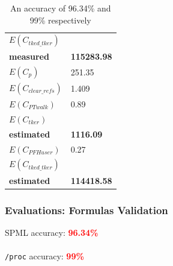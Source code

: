 \documentclass[xcolor=table,bigger,unknownkeysallowed]{beamer}
\newcommand{\myemph}[1]{\textcolor{red}{\bf #1}}
\begin{document}
\begin{frame}
\begin{table}[h]
\begin{subtable}[b]{.45\textwidth}
\begin{tabular}{l l}
				\textcolor{airforceblue}{\textbf{$E(C_{tked\_tker})$}} & \\
				\textcolor{airforceblue}{\textbf{measured}} & \multirow{-2}{*}{\textcolor{airforceblue}{\textbf{115283.98}}}\\
				\midrule
				$E(C_{p})$ & 251.35\\
				$E(C_{clear\_refs})$ & 1.409\\
				$E(C_{PT walk})$ & 0.89\\
				\textcolor{americanrose}{\textbf{$E(C_{tker})$}}  & \\
				\textcolor{americanrose}{\textbf{estimated}} & \multirow{-2}{*}{\textcolor{americanrose}{\textbf{1116.09}}}\\
				\midrule
				$E(C_{PFH user})$ & 0.27\\
				\textcolor{airforceblue}{\textbf{$E(C_{tked\_tker})$}}  &\\
				\textcolor{airforceblue}{\textbf{estimated}} &  \multirow{-2}{*}{\textcolor{airforceblue}{\textbf{114418.58}}}\\
				\bottomrule
			\end{tabular}
			\label{tab:criu-proc-formula}
		\end{subtable}
		\vspace{.3cm}
		\caption{An accuracy of 96.34\% and 99\% respectively}
		\vspace{.3cm}
	\end{table}
\end{frame}  
\begin{frame}
	\frametitle{Evaluations: Formulas Validation}
	\begin{center}
		SPML accuracy: \myemph{96.34\%}\\
		~\\
		\texttt{/proc} accuracy: \myemph{99\%}		
	\end{center}
\end{frame}                 
\end{document}
